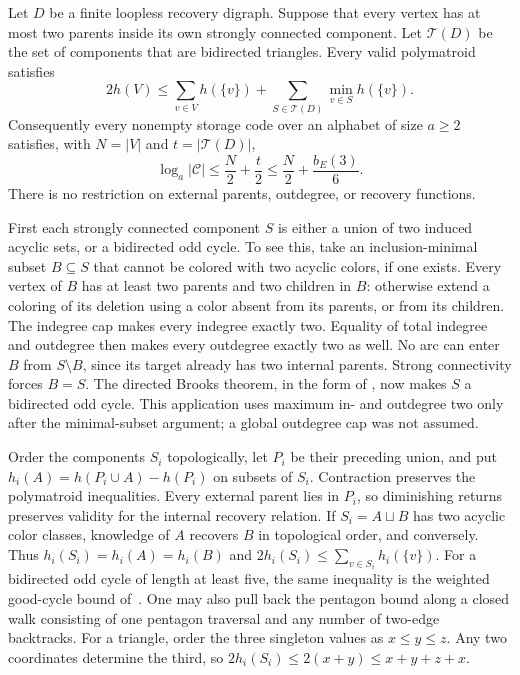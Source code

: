 \begin{theorem}\label{thm:cc-two-input}
\notformalized
Let $D$ be a finite loopless recovery digraph. Suppose that every vertex
has at most two parents inside its own strongly connected component.
Let $\mathcal T(D)$ be the set of components that are bidirected triangles.
Every valid polymatroid satisfies
\[
 2h(V)\le\sum_{v\in V}h(\{v\})+
                 \sum_{S\in\mathcal T(D)}\min_{v\in S}h(\{v\}).
\]
Consequently every nonempty storage code over an alphabet of size $a\ge2$
satisfies, with $N=|V|$ and $t=|\mathcal T(D)|$,
\[
 \log_a|\mathcal C|\le\frac N2+\frac t2
                         \le\frac N2+\frac{b_E(3)}6.
\]
There is no restriction on external parents, outdegree, or recovery functions.
\end{theorem}
\begin{informalproof}
First each strongly connected component $S$ is either a union of two
induced acyclic sets, or a bidirected odd cycle. To see this, take an
inclusion-minimal subset $B\subseteq S$ that cannot be colored with two
acyclic colors, if one exists. Every vertex of $B$ has at least two
parents and two children in $B$: otherwise extend a coloring of its
deletion using a color absent from its parents, or from its children.
The indegree cap makes every indegree exactly two. Equality of total
indegree and outdegree then makes every outdegree exactly two as well.
No arc can enter $B$ from $S\setminus B$, since its target already has
two internal parents. Strong connectivity forces $B=S$.
The directed Brooks theorem, in the form of
\cite[Theorem~1.2 and Section~1.1]{AboulkerAubian}, now makes $S$ a
bidirected odd cycle. This application uses maximum in- and outdegree
two only after the minimal-subset argument; a global outdegree cap was
not assumed.

Order the components $S_i$ topologically, let $P_i$ be their preceding
union, and put $h_i(A)=h(P_i\cup A)-h(P_i)$ on subsets of $S_i$.
Contraction preserves the polymatroid inequalities. Every external
parent lies in $P_i$, so diminishing returns preserves validity for
the internal recovery relation.
If $S_i=A\sqcup B$ has two acyclic color classes, knowledge of $A$
recovers $B$ in topological order, and conversely. Thus
$h_i(S_i)=h_i(A)=h_i(B)$ and
$2h_i(S_i)\le\sum_{v\in S_i}h_i(\{v\})$.
For a bidirected odd cycle of length at least five, the same inequality
is the weighted good-cycle bound of~\cite[Proposition ``Further good targets'']{BrendeCurved}.
One may also pull back the pentagon bound along a closed walk consisting
of one pentagon traversal and any number of two-edge backtracks.
For a triangle, order the three singleton values as $x\le y\le z$.
Any two coordinates determine the third, so
$2h_i(S_i)\le2(x+y)\le x+y+z+x$.


\end{informalproof}
